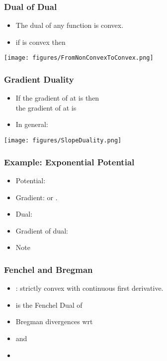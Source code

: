 \documentclass{beamer}
\begin{document}
\begin{frame}
  \frametitle{Dual of Dual}
  \begin{itemize}
  \item The dual of any function is convex.
  \item if  is convex then 
  \end{itemize}
  \texttt{[image: figures/FromNonConvexToConvex.png]}  
\end{frame}

\begin{frame}
  \frametitle{Gradient Duality}
  \begin{itemize}
  \item
    If the gradient of  at  is  then\\
    the gradient of  at  is 
    \item In general:
  \end{itemize}
  \texttt{[image: figures/SlopeDuality.png]}
\end{frame}

\begin{frame}
  \frametitle{Example: Exponential Potential}
  \begin{itemize}
  \item Potential: 
  \item Gradient:  or .
  \item Dual:  
  \item Gradient of dual:  
  \item Note 
   \end{itemize}
 \end{frame}

\begin{frame}
  \frametitle{Fenchel and Bregman}
  \begin{itemize}
  \item
    : strictly convex with continuous first derivative.
  \item {} is the Fenchel Dual of 
  \item {} Bregman divergences wrt 
  \item {} and 
  \item {}
  \end{itemize}
\end{frame}
\end{document}
